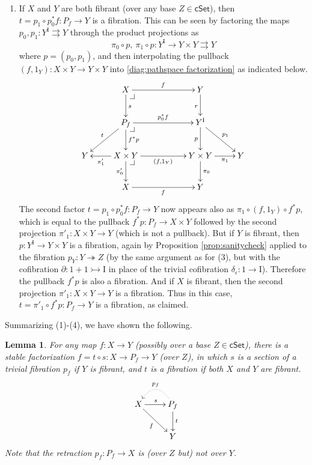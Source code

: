 \documentclass[11pt]{amsart}
\makeatletter
\newcommand{\cSet}{\ensuremath{\mathsf{cSet}}}
\newcommand{\ra}{\ensuremath{\rightarrow}}
\newcommand{\cof}{\ensuremath{\rightarrowtail}}
\newcommand{\fib}{\ensuremath{\twoheadrightarrow}}
\renewcommand{\to}{\ensuremath{\rightarrow}}
\newcommand{\I}{\ensuremath{\mathrm{I}}}
\newcommand{\del}{\ensuremath{\partial}}
\newtheorem{lemma}[theorem]{Lemma}
\theoremstyle{remark}
\theoremstyle{definition}
\newcommand{\pbcorner}[1][dr]{\save*!/#1-1.2pc/#1:(-1,1)@^{|-}\restore}
\makeatother
\begin{document}
\begin{enumerate}
\item If $X$ and $Y$ are both fibrant (over any base $Z\in \cSet$), then $t= p_1\circ p_0^*f : P_f \ra Y$ is a fibration.  This can be seen by factoring the maps $p_0, p_1 :Y^\I \rightrightarrows  Y$ through the product projections as
\[
\pi_0\circ p,\ \pi_1\circ p : Y^\I \ra Y\times Y \rightrightarrows Y
\]
where $p = (p_0, p_1)$, and then interpolating the pullback $(f,1_Y) : X\times Y\ra Y\times Y$ into \eqref{diag:pathspace factorization} as indicated below.
\begin{equation}\label{diag:pathspace factorization2}
\xymatrix{
& X \ar[d]^s \ar[rr]^f \pbcorner && Y \ar[d]_r \\
& \ar[ld]_t P_f  \ar[d]^{f^*p} \ar[rr]^{p_0^*f} \pbcorner && Y^\I \ar[d]_{p} \ar[rd]^{p_1}\\
Y & \ar[l]^-{\pi'_1} X\times Y\ar[d]_-{\pi'_0} \ar[rr]_{(f,1_Y)} \pbcorner  &&  Y\times Y \ar[d]^{\pi_0} \ar[r]_-{\pi_1} & Y \\
& X \ar[rr]_f  &&  Y &
}
\end{equation}
The second factor $t = p_1\circ p_0^*f : P_f \ra Y$ now appears also as $\pi_1\circ(f,1_Y)\circ f^*p$, which is equal to the pullback $f^*p: P_f \ra X\times Y$ followed by the second projection $\pi'_1 : X\times Y \ra Y$ (which is not a pullback). But if $Y$ is fibrant, then $p : Y^\I \ra Y\times Y$ is a fibration, again by Proposition \ref{prop:sanitycheck} applied to the fibration $p_Y : Y\fib Z$ (by the same argument as for (3), but with the cofibration $\del : 1+1 \cof \I$ in place of the trivial cofibration $\delta_\epsilon : 1 \to \I$).  Therefore the pullback  $f^*p$ is also a fibration.  And if $X$ is fibrant, then the second projection $\pi'_1:X\times Y \ra Y$ is a fibration. Thus in this case, $t = \pi'_1\circ f^*p : P_f \ra Y$ is a fibration, as claimed.
\end{enumerate}

Summarizing (1)-(4), we have shown the following.

\begin{lemma}\label{lemma:stablepathspacefactorization} For any map $f : X\ra Y$ (possibly over a base $Z\in \cSet$), there is a stable factorization $f = t\circ s : X\ra P_f \ra Y$ (over $Z$), in which $s$ is a section of a trivial fibration $p_f$ if $Y$ is fibrant, and $t$ is a fibration if both $X$ and $Y$ are fibrant.
\begin{equation}\label{diag:pathspace factorization3}
\xymatrix{
X \ar[r]^s \ar[rd]_f & \ar@{.>}@/_1.5pc/[l]_{p_f} P_f \ar[d]^t \\
& Y
}
\end{equation}
Note that the retraction $p_f : P_f \ra X$ is (over $Z$ but) not over $Y$.
\end{lemma}
\end{document}
